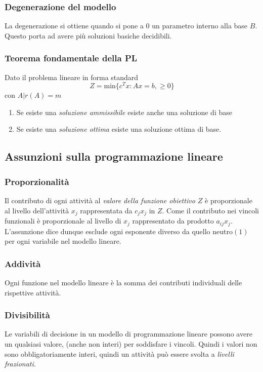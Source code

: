 \documentclass{article}
\begin{document}
\subsubsection{Degenerazione del modello}
La degenerazione si ottiene quando si pone a $0$ un parametro interno alla base $B$. Questo porta ad avere più soluzioni basiche decidibili.

\subsubsection{\textbf{Teorema fondamentale della PL}}
Dato il problema lineare in forma standard
$$Z=\text{min}\{c^Tx:Ax=b, \ge 0 \}$$
con $A|r(A)=m$
\begin{enumerate}
  \item Se esiste una \textit{soluzione ammissibile} esiste anche una soluzione di base
  \item Se esiste una \textit{soluzione ottima} esiste una soluzione ottima di base.
\end{enumerate}

\subsection{Assunzioni sulla programmazione lineare}

\subsubsection{Proporzionalità}
Il contributo di ogni attività al \textit{valore della funzione obiettivo $Z$} è proporzionale al livello dell'attività $x_j$ rappresentata da $c_jx_j$ in $Z$. Come il contributo nei vincoli funzionali è proporzionale al livello di $x_j$ rappresentato da prodotto $a_{ij}x_j$. L'assunzione dice dunque esclude ogni esponente diverso da quello neutro$(1)$ per ogni variabile nel modello lineare.

\subsubsection{Addività}
Ogni funzione nel modello lineare è la somma dei contributi individuali delle rispettive attività.

\subsubsection{Divisibilità}
Le variabili di decisione in un modello di programmazione lineare possono avere un qualsiasi valore, (anche non interi) per soddisfare i vincoli. Quindi i valori non sono obbligatoriamente interi, quindi un attività può essere svolta a \textit{livelli frazionati}.
\end{document}
